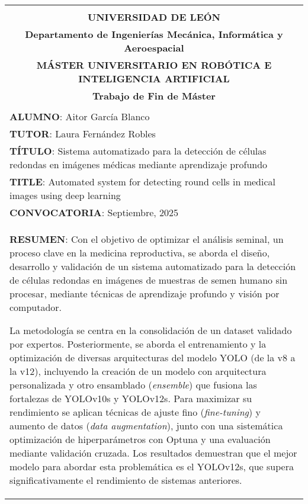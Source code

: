 \begin{center}
\end{center}

\setlength{\LTleft}{-1.25cm}      %
\setlength{\LTright}{0pt}      %

\begin{longtable}{|l|l|}
	\cline{1-2}
	\multicolumn{2}{|c|}{}	\\
	\multicolumn{2}{|c|}{\textbf{UNIVERSIDAD DE LEÓN}}	\\
	\multicolumn{2}{|c|}{\textbf{Departamento de Ingenierías Mecánica, Informática y Aeroespacial}}	\\ 
	\multicolumn{2}{|c|}{\textbf{MÁSTER UNIVERSITARIO EN ROBÓTICA E INTELIGENCIA ARTIFICIAL}}	\\
	\multicolumn{2}{|c|}{\textbf{Trabajo de Fin de Máster}}	\\ 
	\multicolumn{2}{|c|}{}	\\ \hline
	\multicolumn{2}{|l|}{\textbf{ALUMNO}: Aitor García Blanco}	\\ \hline
	\multicolumn{2}{|l|}{\textbf{TUTOR}: Laura Fernández Robles}	\\ \hline
	\multicolumn{2}{|p{17cm}|}{\textbf{TÍTULO}: Sistema automatizado para la detección de células redondas en imágenes médicas mediante aprendizaje profundo} \\ \hline
	\multicolumn{2}{|p{17cm}|}{\textbf{TITLE}: Automated system for detecting round cells in medical images using deep learning} \\ \hline
	\multicolumn{2}{|l|}{\textbf{CONVOCATORIA}: Septiembre, 2025}		\\ \hline
	\multicolumn{2}{|p{17cm}|}{\textbf{RESUMEN}: Con el objetivo de optimizar el análisis seminal, un proceso clave en la medicina reproductiva, 
	se aborda el diseño, desarrollo y validación de un sistema automatizado para la detección de células redondas en imágenes de muestras de semen 
	humano sin procesar, mediante técnicas de aprendizaje profundo y visión por computador.
	
	La metodología se centra en la consolidación de un dataset validado por expertos. Posteriormente, se aborda el entrenamiento y la optimización de 
	diversas arquitecturas del modelo YOLO (de la v8 a la v12), incluyendo la creación de un modelo con arquitectura personalizada y otro ensamblado (\textit{ensemble})
	que fusiona las fortalezas de YOLOv10s y YOLOv12s. Para maximizar su rendimiento se aplican técnicas de ajuste fino (\textit{fine-tuning}) y aumento de datos 
	(\textit{data augmentation}), junto con una sistemática optimización de hiperparámetros con Optuna y una evaluación mediante validación cruzada. 
	Los resultados demuestran que el mejor modelo para abordar esta problemática es el YOLOv12s, que supera significativamente el rendimiento de 
	sistemas anteriores.
	
}
\end{longtable}
